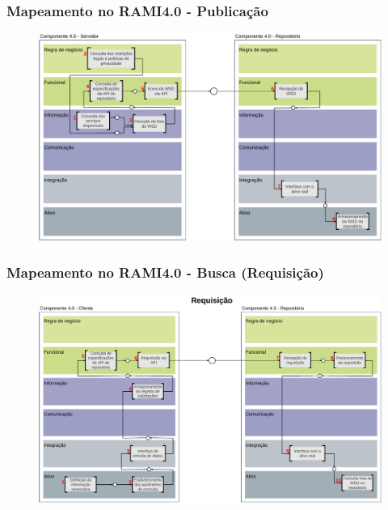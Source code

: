 \documentclass[10pt]{beamer}
\begin{document}
\begin{frame}
	\frametitle{Mapeamento no RAMI4.0 - Publicação}
	
	\begin{figure}[htb]
		\centering
		\label{fig:rami-publicacao}
		\includegraphics[width=1\textwidth]{rami-publicacao}
	\end{figure}
	
\end{frame}
\begin{frame}
	\frametitle{Mapeamento no RAMI4.0 - Busca (Requisição)}
	
	\begin{figure}[htb]
		\centering
		\label{fig:rami-busca-requisicao}
		\includegraphics[width=1\textwidth]{rami-busca-requisicao}

	\end{figure}
	
\end{frame}
\end{document}
